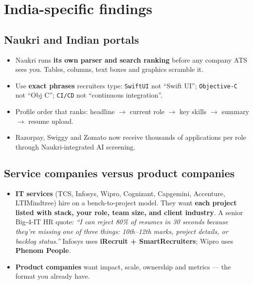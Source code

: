 \documentclass[11pt,a4paper]{article}
\begin{document}
\section{India-specific findings}

\subsection{Naukri and Indian portals}
\begin{itemize}
  \item Naukri runs \textbf{its own parser and search ranking} before any company ATS sees
        you. Tables, columns, text boxes and graphics scramble it.
  \item Use \textbf{exact phrases} recruiters type: \texttt{SwiftUI} not ``Swift UI'';
        \texttt{Objective-C} not ``Obj C''; \texttt{CI/CD} not ``continuous integration''.
  \item Profile order that ranks: headline $\rightarrow$ current role $\rightarrow$ key skills
        $\rightarrow$ summary $\rightarrow$ resume upload.
  \item Razorpay, Swiggy and Zomato now receive thousands of applications per role through
        Naukri-integrated AI screening.
\end{itemize}

\subsection{Service companies versus product companies}
\begin{itemize}
  \item \textbf{IT services} (TCS, Infosys, Wipro, Cognizant, Capgemini, Accenture,
        LTIMindtree) hire on a bench-to-project model. They want \textbf{each project listed
        with stack, your role, team size, and client industry}. A senior Big-4-IT HR quote:
        \emph{``I can reject 80\% of resumes in 30 seconds because they're missing one of
        three things: 10th--12th marks, project details, or backlog status.''}
        Infosys uses \textbf{iRecruit + SmartRecruiters}; Wipro uses \textbf{Phenom People}.
  \item \textbf{Product companies} want impact, scale, ownership and metrics --- the format
        you already have.
\end{itemize}
\end{document}
